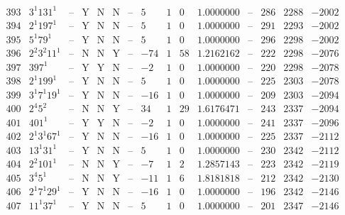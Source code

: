 \documentclass[11pt,reqno,a4letter]{article}
\numberwithin{figure}{section}
\numberwithin{table}{section}
\theoremstyle{plain}
\numberwithin{theorem}{section}
\theoremstyle{definition}
\begin{document}
\begin{table}[h!]
\begin{equation*}
{\begin{array}{|cc|c|ccc|c|c|ccc|c|ccc}
 393 & 3^1 131^1 & \text{--} & \text{Y} & \text{N} & \text{N} & \text{--} & 5 & 1 & 0 & 1.0000000 & \text{--} & 286 & 2288 & -2002 \\
 394 & 2^1 197^1 & \text{--} & \text{Y} & \text{N} & \text{N} & \text{--} & 5 & 1 & 0 & 1.0000000 & \text{--} & 291 & 2293 & -2002 \\
 395 & 5^1 79^1 & \text{--} & \text{Y} & \text{N} & \text{N} & \text{--} & 5 & 1 & 0 & 1.0000000 & \text{--} & 296 & 2298 & -2002 \\
 396 & 2^2 3^2 11^1 & \text{--} & \text{N} & \text{N} & \text{Y} & \text{--} & -74 & 1 & 58 & 1.2162162 & \text{--} & 222 & 2298 & -2076 \\
 397 & 397^1 & \text{--} & \text{Y} & \text{Y} & \text{N} & \text{--} & -2 & 1 & 0 & 1.0000000 & \text{--} & 220 & 2298 & -2078 \\
 398 & 2^1 199^1 & \text{--} & \text{Y} & \text{N} & \text{N} & \text{--} & 5 & 1 & 0 & 1.0000000 & \text{--} & 225 & 2303 & -2078 \\
 399 & 3^1 7^1 19^1 & \text{--} & \text{Y} & \text{N} & \text{N} & \text{--} & -16 & 1 & 0 & 1.0000000 & \text{--} & 209 & 2303 & -2094 \\
 400 & 2^4 5^2 & \text{--} & \text{N} & \text{N} & \text{Y} & \text{--} & 34 & 1 & 29 & 1.6176471 & \text{--} & 243 & 2337 & -2094 \\
 401 & 401^1 & \text{--} & \text{Y} & \text{Y} & \text{N} & \text{--} & -2 & 1 & 0 & 1.0000000 & \text{--} & 241 & 2337 & -2096 \\
 402 & 2^1 3^1 67^1 & \text{--} & \text{Y} & \text{N} & \text{N} & \text{--} & -16 & 1 & 0 & 1.0000000 & \text{--} & 225 & 2337 & -2112 \\
 403 & 13^1 31^1 & \text{--} & \text{Y} & \text{N} & \text{N} & \text{--} & 5 & 1 & 0 & 1.0000000 & \text{--} & 230 & 2342 & -2112 \\
 404 & 2^2 101^1 & \text{--} & \text{N} & \text{N} & \text{Y} & \text{--} & -7 & 1 & 2 & 1.2857143 & \text{--} & 223 & 2342 & -2119 \\
 405 & 3^4 5^1 & \text{--} & \text{N} & \text{N} & \text{Y} & \text{--} & -11 & 1 & 6 & 1.8181818 & \text{--} & 212 & 2342 & -2130 \\
 406 & 2^1 7^1 29^1 & \text{--} & \text{Y} & \text{N} & \text{N} & \text{--} & -16 & 1 & 0 & 1.0000000 & \text{--} & 196 & 2342 & -2146 \\
 407 & 11^1 37^1 & \text{--} & \text{Y} & \text{N} & \text{N} & \text{--} & 5 & 1 & 0 & 1.0000000 & \text{--} & 201 & 2347 & -2146 \\

\end{array}}
\end{equation*}
\end{table}
\end{document}
